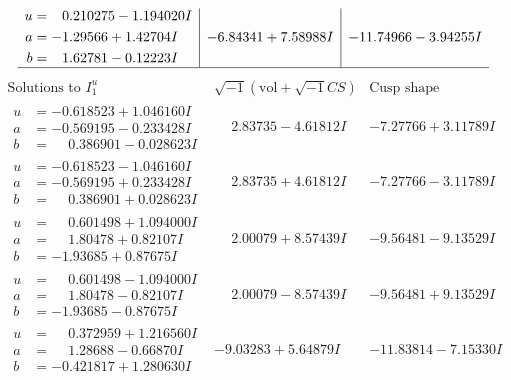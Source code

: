 \documentclass[1p]{elsarticle_modified}
\theoremstyle{definition}
\newcommand{\I}{\sqrt{-1}}
\begin{document}
$$\begin{array}{c|c|c}
\begin{aligned}
u &= \phantom{-}0.210275 - 1.194020 I \\
a &= -1.29566 + 1.42704 I \\
b &= \phantom{-}1.62781 - 0.12223 I\end{aligned}
 & -6.84341 + 7.58988 I & -11.74966 - 3.94255 I\\
 \hline 
 \end{array}$$\newpage$$\begin{array}{c|c|c}  
\text{Solutions to }I^u_{1}& \I (\text{vol} + \sqrt{-1}CS) & \text{Cusp shape}\\
 \hline 
\begin{aligned}
u &= -0.618523 + 1.046160 I \\
a &= -0.569195 - 0.233428 I \\
b &= \phantom{-}0.386901 - 0.028623 I\end{aligned}
 & \phantom{-}2.83735 - 4.61812 I & -7.27766 + 3.11789 I \\ \hline\begin{aligned}
u &= -0.618523 - 1.046160 I \\
a &= -0.569195 + 0.233428 I \\
b &= \phantom{-}0.386901 + 0.028623 I\end{aligned}
 & \phantom{-}2.83735 + 4.61812 I & -7.27766 - 3.11789 I \\ \hline\begin{aligned}
u &= \phantom{-}0.601498 + 1.094000 I \\
a &= \phantom{-}1.80478 + 0.82107 I \\
b &= -1.93685 + 0.87675 I\end{aligned}
 & \phantom{-}2.00079 + 8.57439 I & -9.56481 - 9.13529 I \\ \hline\begin{aligned}
u &= \phantom{-}0.601498 - 1.094000 I \\
a &= \phantom{-}1.80478 - 0.82107 I \\
b &= -1.93685 - 0.87675 I\end{aligned}
 & \phantom{-}2.00079 - 8.57439 I & -9.56481 + 9.13529 I \\ \hline\begin{aligned}
u &= \phantom{-}0.372959 + 1.216560 I \\
a &= \phantom{-}1.28688 - 0.66870 I \\
b &= -0.421817 + 1.280630 I\end{aligned}
 & -9.03283 + 5.64879 I & -11.83814 - 7.15330 I \\ \hline\begin{aligned}

\end{aligned}
\end{array}$$
\end{document}
